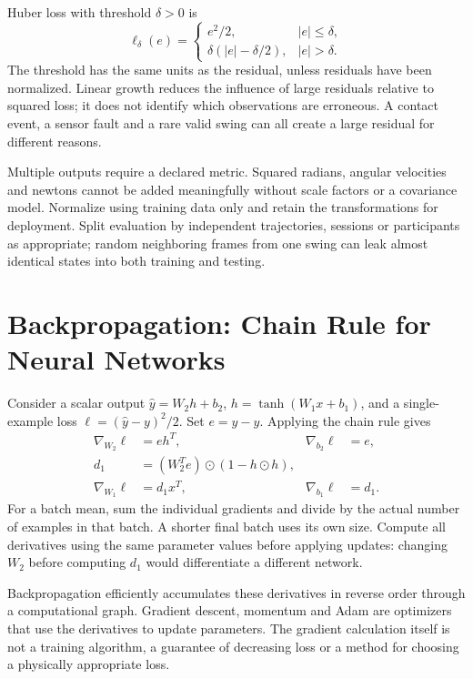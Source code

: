 Huber loss with threshold $\delta>0$ is
\begin{equation}
\ell_\delta(e)=
\begin{cases}
e^2/2,&|e|\le\delta,\\
\delta(|e|-\delta/2),&|e|>\delta.
\end{cases}
\end{equation}
The threshold has the same units as the residual, unless residuals have been normalized. Linear growth reduces the influence of large residuals relative to squared loss; it does not identify which observations are erroneous. A contact event, a sensor fault and a rare valid swing can all create a large residual for different reasons.

Multiple outputs require a declared metric. Squared radians, angular velocities and newtons cannot be added meaningfully without scale factors or a covariance model. Normalize using training data only and retain the transformations for deployment. Split evaluation by independent trajectories, sessions or participants as appropriate; random neighboring frames from one swing can leak almost identical states into both training and testing.

\section{Backpropagation: Chain Rule for Neural Networks}

Consider a scalar output $\hat y=W_2h+b_2$, $h=\tanh(W_1x+b_1)$, and a single-example loss $\ell=(\hat y-y)^2/2$. Set $e=\hat y-y$. Applying the chain rule gives
\begin{equation}
\begin{aligned}
\nabla_{W_2}\ell&=eh^T,&\nabla_{b_2}\ell&=e,\\
d_1&=(W_2^Te)\odot(1-h\odot h),\\
\nabla_{W_1}\ell&=d_1x^T,&\nabla_{b_1}\ell&=d_1.
\end{aligned}
\end{equation}
For a batch mean, sum the individual gradients and divide by the actual number of examples in that batch. A shorter final batch uses its own size. Compute all derivatives using the same parameter values before applying updates: changing $W_2$ before computing $d_1$ would differentiate a different network.

Backpropagation efficiently accumulates these derivatives in reverse order through a computational graph. Gradient descent, momentum and Adam are optimizers that use the derivatives to update parameters. The gradient calculation itself is not a training algorithm, a guarantee of decreasing loss or a method for choosing a physically appropriate loss.

